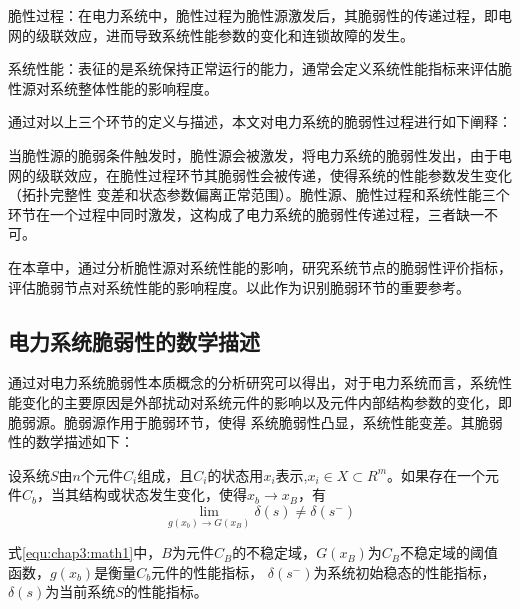 脆性过程：在电力系统中，脆性过程为脆性源激发后，其脆弱性的传递过程，即电网的级联效应，进而导致系统性能参数的变化和连锁故障的发生。

系统性能：表征的是系统保持正常运行的能力，通常会定义系统性能指标来评估脆性源对系统整体性能的影响程度。

通过对以上三个环节的定义与描述，本文对电力系统的脆弱性过程进行如下阐释：

当脆性源的脆弱条件触发时，脆性源会被激发，将电力系统的脆弱性发出，由于电网的级联效应，在脆性过程环节其脆弱性会被传递，使得系统的性能参数发生变化（拓扑完整性
变差和状态参数偏离正常范围）。脆性源、脆性过程和系统性能三个环节在一个过程中同时激发，这构成了电力系统的脆弱性传递过程，三者缺一不可。

在本章中，通过分析脆性源对系统性能的影响，研究系统节点的脆弱性评价指标，评估脆弱节点对系统性能的影响程度。以此作为识别脆弱环节的重要参考。






\subsection{电力系统脆弱性的数学描述}
\label{sec:describtion}

通过对电力系统脆弱性本质概念的分析研究可以得出，对于电力系统而言，系统性能变化的主要原因是外部扰动对系统元件的影响以及元件内部结构参数的变化，即脆弱源。脆弱源作用于脆弱环节，使得
系统脆弱性凸显，系统性能变差。其脆弱性的数学描述如下：

设系统$S$由$n$个元件$C_i$组成，且$C_i$的状态用$x_i$表示,$x_i \in X \subset R^m$。如果存在一个元件$C_b$，当其结构或状态发生变化，使得$x_b \to x_B$，有
\begin{equation}
  \label{equ:chap3:math1}
  \lim _{g\left(x_{b}\right) \rightarrow G\left(x_{B}\right)} \delta(s) \neq \delta\left(s^{-}\right)
  \end{equation}
 
式\ref{equ:chap3:math1}中，$B$为元件$C_B$的不稳定域，$G\left(x_{B}\right)$为$C_B$不稳定域的阈值函数，$g(x_b)$是衡量$C_b$元件的性能指标，
$\delta\left(s^{-}\right)$为系统初始稳态的性能指标，$\delta\left(s\right)$为当前系统$S$的性能指标。

